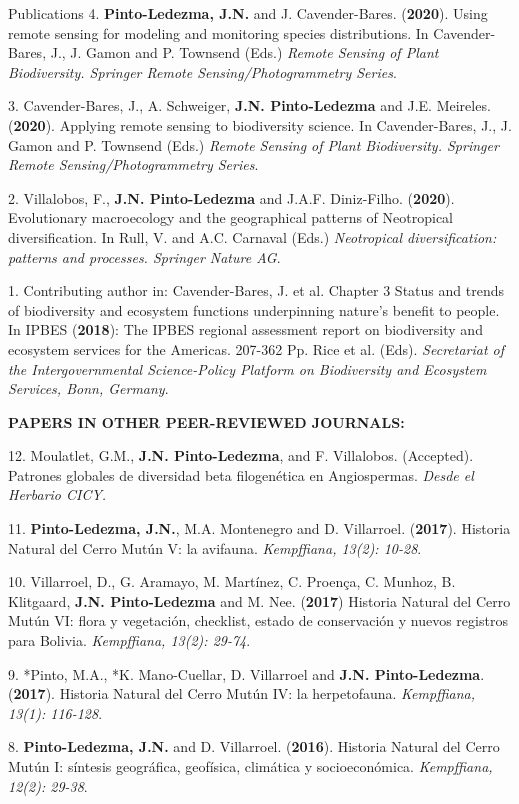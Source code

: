 \documentclass{resume} %
\begin{document}
\begin{rSection}{Publications}
{4.} {\bf{Pinto-Ledezma, J.N.}} {and J. Cavender-Bares. ({{\bf 2020}}). Using remote sensing for modeling and monitoring species distributions. In Cavender-Bares, J., J. Gamon and P. Townsend (Eds.)} {\em Remote Sensing of Plant Biodiversity. Springer Remote Sensing/Photogrammetry Series}.

{3.} {Cavender-Bares, J., A. Schweiger,} {\bf{J.N. Pinto-Ledezma}} {and J.E. Meireles. ({{\bf 2020}}). Applying remote sensing to biodiversity science. In Cavender-Bares, J., J. Gamon and P. Townsend (Eds.)} {\em Remote Sensing of Plant Biodiversity. Springer Remote Sensing/Photogrammetry Series}. 

{2.} {Villalobos, F.,} {\bf{J.N. Pinto-Ledezma}} {and J.A.F. Diniz-Filho. ({{\bf 2020}}). Evolutionary macroecology and the geographical patterns of Neotropical diversification. In Rull, V. and A.C. Carnaval (Eds.)} {\em Neotropical diversification: patterns and processes. Springer Nature AG}. 

{1.} {Contributing author in: Cavender-Bares, J. et al. Chapter 3 Status and trends of biodiversity and ecosystem functions underpinning nature’s benefit to people. In IPBES ({{\bf 2018}}): {The IPBES regional assessment report on biodiversity and ecosystem services for the Americas}. 207-362 Pp. Rice et al. (Eds).} {\em Secretariat of the Intergovernmental Science-Policy Platform on Biodiversity and Ecosystem Services, Bonn, Germany}. 

{\bf PAPERS IN OTHER PEER-REVIEWED JOURNALS:} 

{12.} {Moulatlet, G.M.,} {\bf{J.N. Pinto-Ledezma}}, {and F. Villalobos. (Accepted). Patrones globales de diversidad beta filogenética en Angiospermas.} {\em Desde el Herbario CICY.}

{11.} {\bf{Pinto-Ledezma, J.N.}}, {M.A. Montenegro and D. Villarroel. ({{\bf 2017}}). Historia Natural del Cerro Mutún V: la avifauna.} {\em Kempffiana, 13(2): 10-28}.

{10.} {Villarroel, D., G. Aramayo, M. Martínez, C. Proença, C. Munhoz, B. Klitgaard,} {\bf{J.N. Pinto-Ledezma}} {and M. Nee. ({{\bf 2017}}) Historia Natural del Cerro Mutún VI: flora y vegetación, checklist, estado de conservación y nuevos registros para Bolivia.} {\em Kempffiana, 13(2): 29-74}.

{9.} {*Pinto, M.A., *K. Mano-Cuellar, D. Villarroel and} {\bf{J.N. Pinto-Ledezma}}. {({{\bf 2017}}). Historia Natural del Cerro Mutún IV: la herpetofauna.} {\em Kempffiana, 13(1): 116-128}.

{8.} {\bf{Pinto-Ledezma, J.N.}} {and D. Villarroel. ({{\bf 2016}}). Historia Natural del Cerro Mutún I: síntesis geográfica, geofísica, climática y socioeconómica.} {\em Kempffiana, 12(2): 29-38}.


\end{rSection}
\end{document}
